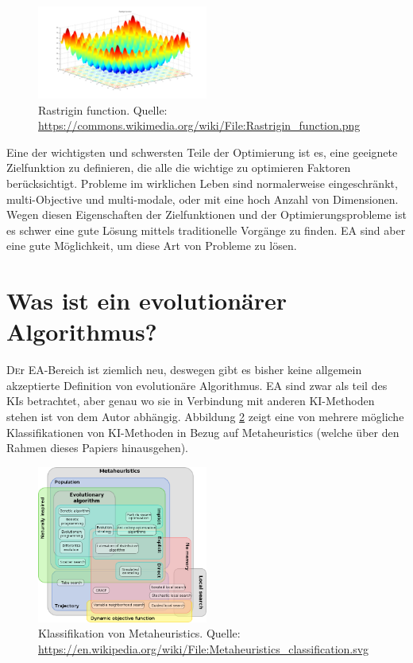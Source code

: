 \documentclass[twoside,twocolumn]{article}
\begin{document}
\begin{figure}[h]
\caption{ Rastrigin function. Quelle: \url{https://commons.wikimedia.org/wiki/File:Rastrigin_function.png}}
\label{fig:rastrigin}
\centering
\includegraphics[width=0.5\textwidth]{images/rastrigin_function.png}
\end{figure}

Eine der wichtigsten und schwersten Teile der Optimierung ist es, eine geeignete Zielfunktion zu definieren, die alle die wichtige zu optimieren Faktoren berücksichtigt.
Probleme im wirklichen Leben sind normalerweise eingeschränkt, multi-Objective und multi-modale, oder mit eine hoch Anzahl von Dimensionen. Wegen diesen Eigenschaften der Zielfunktionen und der Optimierungsprobleme ist es schwer eine gute Lösung mittels traditionelle Vorgänge  zu finden. EA sind aber eine gute Möglichkeit, um diese Art von Probleme zu lösen.


\section{Was ist ein evolutionärer Algorithmus?}

\lettrine[nindent=0em,lines=3]{D} er EA-Bereich ist ziemlich neu, deswegen gibt es bisher keine allgemein akzeptierte Definition von evolutionäre Algorithmus. EA sind zwar als teil des KIs betrachtet, aber genau wo sie in Verbindung mit anderen KI-Methoden stehen ist von dem Autor abhängig. Abbildung \ref{fig:metaheuristics} zeigt eine von mehrere mögliche Klassifikationen von KI-Methoden in Bezug auf Metaheuristics (welche über den Rahmen dieses Papiers hinausgehen).\\

\begin{figure}[h]
\caption{ Klassifikation von Metaheuristics. Quelle: \url{https://en.wikipedia.org/wiki/File:Metaheuristics_classification.svg}}
\label{fig:metaheuristics}
\centering
\includegraphics[width=0.5\textwidth]{images/metaheuristics_classification.png}
\end{figure}
\end{document}
